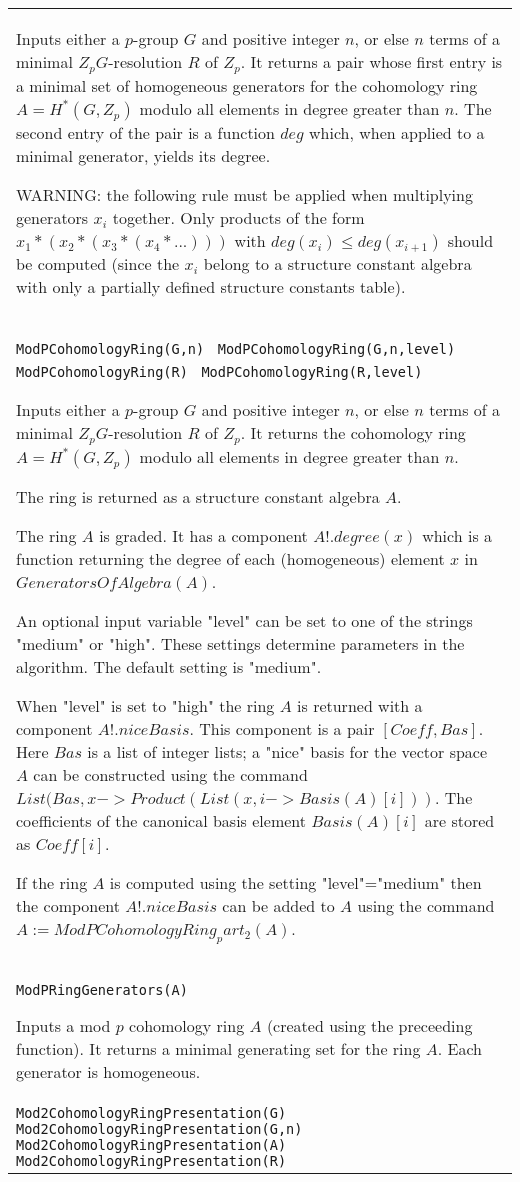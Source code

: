 \documentclass[a4paper,11pt]{report}
\begin{document}
{\begin{center}
\begin{tabular}{|l|}
 Inputs either a $p$-group $G$ and positive integer $n$, or else $n$ terms of a minimal $Z_pG$-resolution $R$ of $Z_p$. It returns a pair whose first entry is a minimal set of homogeneous
generators for the cohomology ring $A=H^*(G,Z_p)$ modulo all elements in degree greater than $n$. The second entry of the pair is a function $deg$ which, when applied to a minimal generator, yields its degree. 

 WARNING: the following rule must be applied when multiplying generators $x_i$ together. Only products of the form $x_1*(x_2*(x_3*(x_4*...)))$ with $deg(x_i) \le deg(x_{i+1})$ should be computed (since the $x_i$ belong to a structure constant algebra with only a partially defined structure
constants table). \\
 \index{ModPCohomologyRing} \texttt{ModPCohomologyRing(G,n) } \texttt{ModPCohomologyRing(G,n,level) } \texttt{ModPCohomologyRing(R) } \texttt{ModPCohomologyRing(R,level)} 

 Inputs either a $p$-group $G$ and positive integer $n$, or else $n$ terms of a minimal $Z_pG$-resolution $R$ of $Z_p$. It returns the cohomology ring $A=H^*(G,Z_p)$ modulo all elements in degree greater than $n$. 

 The ring is returned as a structure constant algebra $A$. 

 The ring $A$ is graded. It has a component $A!.degree(x)$ which is a function returning the degree of each (homogeneous) element $x$ in $GeneratorsOfAlgebra(A)$. 

 An optional input variable "level" can be set to one of the strings "medium"
or "high". These settings determine parameters in the algorithm. The default
setting is "medium". 

 When "level" is set to "high" the ring $A$ is returned with a component $A!.niceBasis$. This component is a pair $[Coeff,Bas]$. Here $Bas$ is a list of integer lists; a "nice" basis for the vector space $A$ can be constructed using the command $List(Bas,x->Product(List(x,i->Basis(A)[i]))$. The coefficients of the canonical basis element $Basis(A)[i]$ are stored as $Coeff[i]$. 

 If the ring $A$ is computed using the setting "level"="medium" then the component $A!.niceBasis$ can be added to $A$ using the command $ A:=ModPCohomologyRing_part_2(A) $. \\
 \index{ModPRingGenerators} \texttt{ModPRingGenerators(A) } 

 Inputs a mod $p$ cohomology ring $A$ (created using the preceeding function). It returns a minimal generating set
for the ring $A$. Each generator is homogeneous. \\
 \texttt{Mod2CohomologyRingPresentation(G) } \texttt{Mod2CohomologyRingPresentation(G,n) } \texttt{Mod2CohomologyRingPresentation(A) } \texttt{Mod2CohomologyRingPresentation(R)} 


\end{tabular}
\end{center}}
\end{document}
